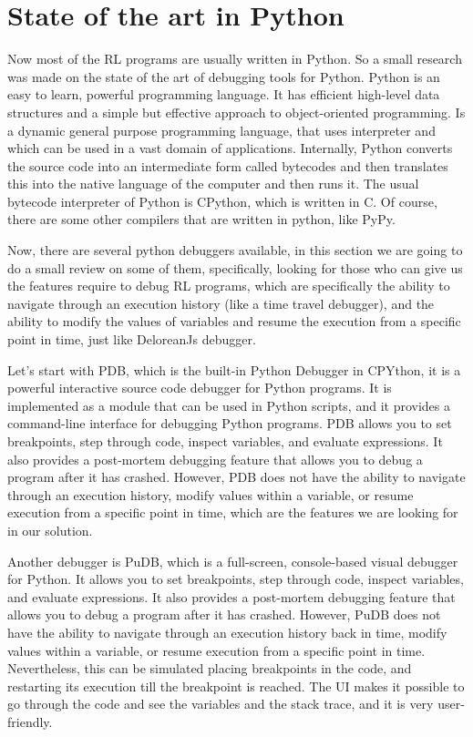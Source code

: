 \section{State of the art in Python}
\label{sec:py}
Now most of the \ac{RL} programs are usually written in Python. So a small research was
made on the state of the art of debugging tools for Python. Python is an easy to learn, 
powerful programming language. It has efficient high-level data structures and a simple 
but effective approach to object-oriented programming. Is a dynamic general purpose 
programming language, that uses interpreter and which can be used in a vast domain 
of applications\cite{10.5555/2846189}. Internally, Python converts the source code 
into an intermediate form called bytecodes and then translates this into the native 
language of the computer and then runs it. The usual bytecode interpreter of Python 
is CPython\cite{shaw2021cpython}, which is written in C. Of course, there are some 
other compilers that are written in python, like PyPy.

Now, there are several python debuggers available, in this section we are going to do a 
small review on some of them, specifically, looking for those who can give us the features 
require to debug \ac{RL} programs, which are specifically the ability to navigate through
an execution history (like a time travel debugger), and the ability to modify the values
of variables and resume the execution from a specific point in time, just like 
DeloreanJs\cite{delorean23} debugger.

Let's start with \ac{PDB}\cite{python-pdb}, which is the built-in Python Debugger in CPYthon, it is a 
powerful interactive source code debugger for Python programs. It is implemented as a 
module that can be used in Python scripts, and it provides a command-line interface 
for debugging Python programs. \ac{PDB} allows you to set breakpoints, step through 
code, inspect variables, and evaluate expressions. It also provides a post-mortem 
debugging feature that allows you to debug a program after it has crashed. However, 
\ac{PDB} does not have the ability to navigate through an execution history, modify 
values within a variable, or resume execution from a specific point in time, which 
are the features we are looking for in our solution.

Another debugger is PuDB\cite{pudb}, which is a full-screen, console-based visual 
debugger for Python. It allows you to set breakpoints, step through code, inspect 
variables, and evaluate expressions. It also provides a post-mortem debugging feature 
that allows you to debug a program after it has crashed. However, PuDB does not 
have the ability to navigate through an execution history back in time, modify values 
within a variable, or resume execution from a specific point in time. Nevertheless, this 
can be simulated placing breakpoints in the code, and restarting its execution till the 
breakpoint is reached. The UI makes it possible to go through the code and see the 
variables and the stack trace, and it is very user-friendly.

